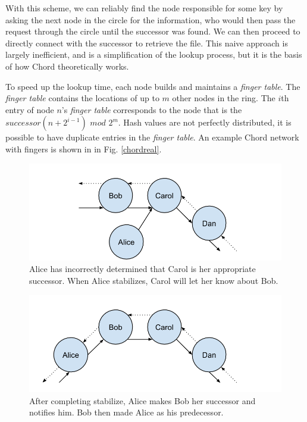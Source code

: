 With this scheme, we can reliably find the node responsible for some key by asking the next node in the circle for the information, who would then pass the request through the circle until the successor was found.  We can then proceed to directly connect with the successor to retrieve the file.  This naive approach is largely inefficient, and is a simplification of the lookup process, but it is the basis of how Chord theoretically works.

To speed up the lookup time, each node builds and maintains a \emph{finger table}.  The \emph{finger table} contains the locations of up to $m$ other nodes in the ring.  The $i$th entry of node $n$'s \emph{finger table} corresponds to the node that is the $successor(n+2^{i-1})$ $mod$ $2^m$. Hash values are not perfectly distributed, it is possible to have duplicate entries in the \emph{finger table}. An example Chord network with fingers is shown in in Fig. \ref{chordreal}.


\begin{figure}
	\includegraphics[width=\linewidth]{figs/abcd1}
	\caption{Alice has incorrectly determined that Carol is her appropriate successor.  When Alice stabilizes, Carol will let her know about Bob.}
	\label{fig:abcd1}
\end{figure}


\begin{figure}
	\includegraphics[width=\linewidth]{figs/abcd2}
	\caption{After completing stabilize, Alice makes Bob her successor and notifies him. Bob then made Alice as his predecessor.}
	\label{fig:abcd2}
\end{figure}



